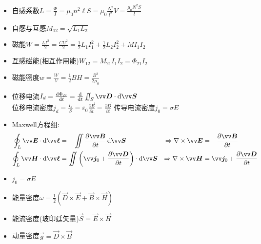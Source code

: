 \documentclass{article}
\begin{document}
\begin{itemize}
  \item 自感系数$L=\frac{\Phi}{I}=\mu_0 n^2 \ell S = \mu_0 \frac{N^2}{l^2}V = \frac{\mu_0 N^2 S}{l}$
  \item 自感与互感$M_{12}=\sqrt{L_1 L_2}$
  \item 磁能$W=\frac{LI^2}{2}=\frac{CU^2}{2}=\frac{1}{2}L_1 I_1^2 +\frac{1}{2}L_2 I_2^2 +MI_1I_2$
  \item 互感磁能(相互作用能)$W_{12}=M_{21}I_1I_2=\Phi_{21}I_2$
  \item 磁能密度$w=\frac{W}{V}=\frac{1}{2}BH=\frac{B^2}{2\mu_0}$
  \item 位移电流$I_d=\frac{\dif \Phi _D}{\dif t}=\frac{\dif}{\dif t}\iint_S \vec{D}\cdot \dif \vec{S}$\\
        位移电流密度$j_d=\frac{I_d}{S}=\varepsilon_0 \frac{\partial \vec{E}}{\partial t}=\frac{\partial \vec{D}}{\partial t}$
        传导电流密度$j_0=\sigma E$
  \item Maxwell方程组:
        \[\begin{aligned}
          \oint_L \vec{E}\cdot \dif \vec{\ell} &= -\iint \frac{\partial \vec{B}}{\partial t}\dif \vec{S} &\Rightarrow \nabla\times \vec{E} &= -\frac{\partial \vec{B}}{\partial t}\\
          \oint_L \vec{H}\cdot \dif \vec{\ell} &= \iint \left(\vec{j}_0+\frac{\partial \vec{D}}{\partial t}\right)\cdot \dif \vec{S} &\Rightarrow \nabla\times \vec{H} &= \vec{j}_0+\frac{\partial \vec{D}}{\partial t}
        \end{aligned}\]
  \item $j_0=\sigma E$
  \item 能量密度$\omega=\frac{1}{2}(\vec{D}\times \vec{E}+\vec{B}\times \vec{H})$
  \item 能流密度(玻印廷矢量)$\vec{S}= \vec{E}\times \vec{H}$
  \item 动量密度$\vec{g}=\vec{D}\times \vec{B}$
\end{itemize}

\appendix
\end{document}
